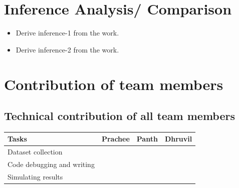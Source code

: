 \documentclass{article}
\begin{document}







\section{Inference Analysis/ Comparison}

\begin{itemize}

\item Derive inference-1 from the work.

\item Derive inference-2 from the work.
\end{itemize}

\section{ Contribution of team members}
\subsection{Technical contribution of all team members }
\begin{table}[h]
\centering
\begin{tabular}{|l|l|l|l|}
\hline
Tasks              & Prachee       & Panth         & Dhruvil \\ \hline
Dataset collection &               &               &         \\ \hline
Code debugging and writing     &               &               &         \\ \hline
Simulating results &               &               &         \\ \hline
\end{tabular}
\end{table}
\end{document}
